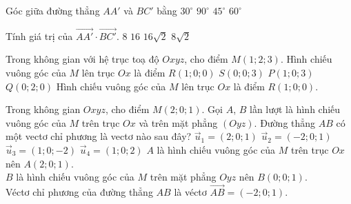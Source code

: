 %

\begin{ex}%
	Góc giữa đường thẳng $AA'$ và $BC'$ bằng
	\choice
	{$30^{\circ}$}
	{$90^{\circ}$}
	{\True $45^{\circ}$}
	{$60^{\circ}$}
\end{ex}

%

\begin{ex}%
	Tính giá trị của $\overrightarrow{AA'} \cdot \overrightarrow{BC'}$.
	\choice
	{$8$}
	{$16$}
	{$16\sqrt{2}$}
	{\True $8\sqrt{2}$}
\end{ex}

\begin{ex}%
	Trong không gian với hệ trục toạ độ $Oxyz$, cho điểm $M\left(1; 2; 3\right)$. Hình chiếu vuông góc của $M$ lên trục $Ox$ là điểm
	\choice
	{\True $R\left(1; 0; 0 \right)$}
	{$S\left(0; 0; 3 \right)$}
	{$P\left(1; 0; 3 \right)$}
	{$Q\left(0; 2; 0 \right)$}
	\loigiai
	{Hình chiếu vuông góc của $M$ lên trục $Ox$ là điểm $R\left(1; 0; 0 \right)$.
	}
\end{ex}

\begin{ex}%
	Trong không gian $Oxyz$, cho điểm $M(2;0;1)$. Gọi $A$, $B$ lần lượt là hình chiếu vuông góc của $M$ trên trục $O x$ và trên mặt phẳng $(Oyz)$. Đường thẳng $AB$ có một vectơ chỉ phương là vectơ nào sau đây?
	\choice
	{$\vec{u}_1=(2;0;1)$}
	{\True $\vec{u}_2=(-2;0;1)$}
	{$\vec{u}_3=(1;0;-2)$}
	{$\vec{u}_4=(1;0;2)$}
	\loigiai
	{
	$A$ là hình chiếu vuông góc của $M$ trên trục $Ox$ nên $A(2;0;1)$.\\
	$B$ là hình chiếu vuông góc của $M$ trên mặt phẳng $Oyz$ nên $B(0;0;1)$.\\
	Véctơ chỉ phương của đường thẳng $AB$ là véctơ $\overrightarrow{AB}=(-2;0;1)$.
	}
\end{ex}

%

